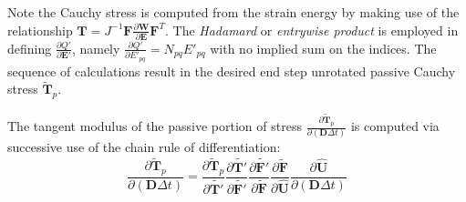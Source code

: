 Note the Cauchy stress is computed from the strain energy by making use of the relationship $\bm{T} = J^{-1}\bm{F}\frac{\partial\bm{W}}{\partial \bm{E}} \bm{F}^T$. The \textit{Hadamard} or \textit{entrywise product} is employed in defining $\frac{\partial Q'}{\partial \bm{E}'}$, namely $\frac{\partial Q'}{\partial E'_{pq}} = N_{pq}E'_{pq}$ with no implied sum on the indices. The sequence of calculations result in the desired end step unrotated passive Cauchy stress $\tilde{\bm{T}}_p$.

The tangent modulus of the passive portion of stress $\frac{\partial \tilde{\bm{T}}_p}{\partial (\bm{D}\Delta{t})}$ is computed via successive use of the chain rule of differentiation:
\begin{equation}
\frac{\partial \tilde{\bm{T}}_p}{\partial (\bm{D}\Delta{t})} = \frac{\partial \tilde{\bm{T}}_p}{\partial \tilde{\bm{T}'}}\frac{\partial \tilde{\bm{T}'}}{\partial \tilde{\bm{F}'}}\frac{\partial \tilde{\bm{F}'}}{\partial \tilde{\bm{F}}}\frac{\partial \tilde{\bm{F}}}{\partial \hat{\bm{U}}}\frac{\partial \hat{\bm{U}}}{\partial (\bm{D}\Delta{t})}
\label{eqn:tanmod}
\end{equation}

